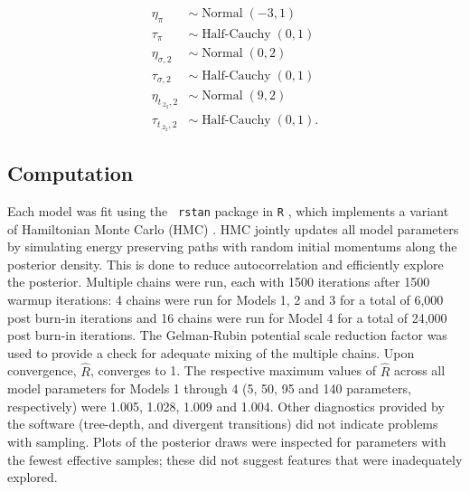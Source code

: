 \documentclass[12pt]{article}
\newcommand{\op}{\operatorname}
\begin{document}
\begin{align*}
  \eta_{\pi} & \sim \op{Normal}(-3, 1)\\
  \tau_{\pi} & \sim \op{Half-Cauchy}(0, 1)\\
  \eta_{\sigma ,2} & \sim \op{Normal}(0, 2)\\
  \tau_{\sigma ,2} & \sim \op{Half-Cauchy}(0, 1)\\
  \eta_{t_{.2_2},2} & \sim \op{Normal}(9, 2)\\
  \tau_{t_{.2_2},2} & \sim \op{Half-Cauchy}(0, 1).
 \end{align*} 

\subsection{Computation}
\label{sec:Computation}
Each model was fit using the {\tt
  rstan} \citep{rstan} package in {\tt R} \citep{r}, which implements a variant of Hamiltonian Monte Carlo (HMC)
\citep{betancourt}. HMC jointly updates all model parameters by simulating energy preserving paths with random initial momentums along the posterior density. This is done to reduce autocorrelation and efficiently explore the posterior. Multiple chains were run, each with 1500 iterations after 1500 warmup iterations: 4 chains were run for Models 1, 2 and 3 for a total of 6,000 post burn-in iterations and 16 chains were run for Model 4 for a total of 24,000 post burn-in iterations. The Gelman-Rubin potential scale reduction factor was used to provide a check for adequate mixing of the multiple chains. Upon convergence, $\hat{R}$, converges to 1.  The  respective maximum values of $\hat{R}$ across all model parameters for Models 1 through 4 (5, 50, 95 and 140 parameters, respectively) were 1.005, 1.028, 1.009 and 1.004. Other diagnostics provided by the software (tree-depth, and divergent transitions) did not indicate problems with sampling. Plots of the posterior draws were inspected for parameters with the fewest effective samples; these did not suggest features that were inadequately explored.

\end{document}
